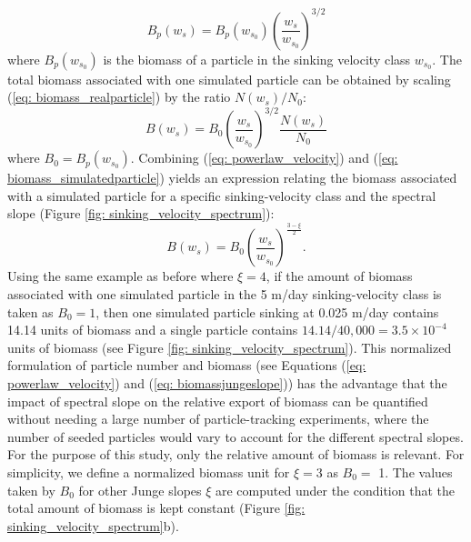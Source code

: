 \documentclass[article,linenumbers]{agujournal2018}
\begin{document}
	\begin{equation}
		B_p(w_s) = B_p(w_{s_0})\left(\frac{w_s}{w_{s_0}}\right)^{3/2}
		\label{eq: biomass_realparticle}
	\end{equation}
	where $B_p(w_{s_0})$ is the biomass of a particle in the sinking velocity class $w_{s_0}$. The total biomass associated with one simulated particle can be obtained by scaling (\ref{eq: biomass_realparticle}) by the ratio $N(w_s)/N_0$:
	\begin{equation}
		B(w_s) =  B_0\left(\frac{w_s}{w_{s_0}}\right)^{3/2}\frac{N(w_s)}{N_0}
		\label{eq: biomass_simulatedparticle}
	\end{equation}
	where $B_0 = B_p(w_{s_0})$. Combining (\ref{eq: powerlaw_velocity}) and (\ref{eq: biomass_simulatedparticle}) yields an expression relating the biomass associated with a simulated particle for a specific sinking-velocity class and the spectral slope (Figure \ref{fig: sinking_velocity_spectrum}):
	\begin{equation}
		B(w_s) = B_0\left(\frac{w_s}{w_{s_0}}\right)^{\frac{3-\xi}{2}}.
		\label{eq: biomassjungeslope}
	\end{equation}
	Using the same example as before where $\xi = 4$, if the amount of biomass associated with one simulated particle in the 5 m/day sinking-velocity class is taken as $B_0 = 1$, then one simulated particle sinking at 0.025 m/day contains 14.14 units of biomass and a single particle contains $14.14/40,000 =3.5\times10^{-4}$ units of biomass (see Figure \ref{fig: sinking_velocity_spectrum}). This normalized formulation of particle number and biomass (see Equations (\ref{eq: powerlaw_velocity}) and (\ref{eq: biomassjungeslope})) has the advantage that the impact of spectral slope on the relative export of biomass can be quantified without needing a large number of particle-tracking experiments, where the number of seeded particles would vary to account for the different spectral slopes. For the purpose of this study, only the relative amount of biomass is relevant. For simplicity, we define a normalized biomass unit for $\xi =3$ as $B_0=$ 1. The values taken by $B_0$ for other Junge slopes $\xi$ are computed under the condition that the total amount of biomass is kept constant (Figure \ref{fig: sinking_velocity_spectrum}b).
	
\end{document}
